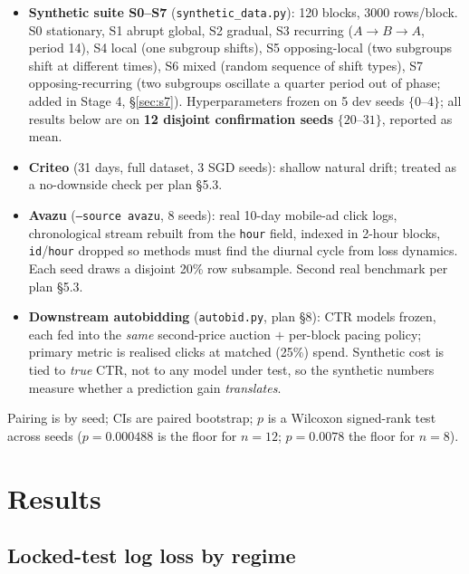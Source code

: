\documentclass[11pt]{article}
\begin{document}
\begin{itemize}[nosep]
\item \textbf{Synthetic suite S0--S7} (\texttt{synthetic\_data.py}): 120 blocks,
3000 rows/block. S0 stationary, S1 abrupt global, S2 gradual, S3 recurring
($A\!\to\!B\!\to\!A$, period 14), S4 local (one subgroup shifts), S5
opposing-local (two subgroups shift at different times), S6 mixed (random
sequence of shift types), S7 opposing-recurring (two subgroups oscillate a
quarter period out of phase; added in Stage 4, \S\ref{sec:s7}).
Hyperparameters frozen on 5 dev seeds
$\{0\text{--}4\}$; all results below are on \textbf{12 disjoint confirmation
seeds} $\{20\text{--}31\}$, reported as mean.
\item \textbf{Criteo} (31 days, full dataset, 3 SGD seeds): shallow natural
drift; treated as a no-downside check per plan \S5.3.
\item \textbf{Avazu} (\texttt{--source avazu}, 8 seeds): real 10-day mobile-ad
click logs, chronological stream rebuilt from the \texttt{hour} field, indexed
in 2-hour blocks, \texttt{id}/\texttt{hour} dropped so methods must find the
diurnal cycle from loss dynamics. Each seed draws a disjoint 20\% row
subsample. Second real benchmark per plan \S5.3.
\item \textbf{Downstream autobidding} (\texttt{autobid.py}, plan \S8): CTR
models frozen, each fed into the \emph{same} second-price auction $+$ per-block
pacing policy; primary metric is realised clicks at matched (25\%) spend.
Synthetic cost is tied to \emph{true} CTR, not to any model under test, so the
synthetic numbers measure whether a prediction gain \emph{translates}.
\end{itemize}
Pairing is by seed; CIs are paired bootstrap; $p$ is a Wilcoxon signed-rank test
across seeds ($p=0.000488$ is the floor for $n=12$; $p=0.0078$ the floor for
$n=8$).

\section{Results}

\subsection{Locked-test log loss by regime}
\end{document}
